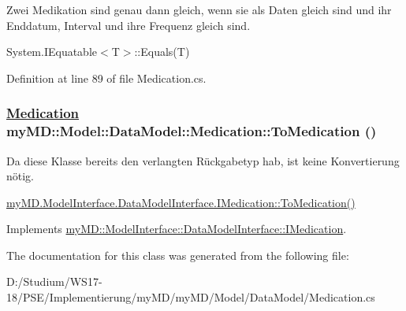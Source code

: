 Zwei Medikation sind genau dann gleich, wenn sie als Daten gleich sind und ihr Enddatum, Interval und ihre Frequenz gleich sind. 

System.IEquatable$<$T$>$::Equals(T) 

Definition at line 89 of file Medication.cs.\hypertarget{classmy_m_d_1_1_model_1_1_data_model_1_1_medication_be8159bf4c393a1da18275bd4dfa8e4a}{
\subsubsection[ToMedication]{\setlength{\rightskip}{0pt plus 5cm}\hyperlink{classmy_m_d_1_1_model_1_1_data_model_1_1_medication}{Medication} my\-MD::Model::Data\-Model::Medication::To\-Medication ()}}
\label{d0/daf/classmy_m_d_1_1_model_1_1_data_model_1_1_medication_be8159bf4c393a1da18275bd4dfa8e4a}


Da diese Klasse bereits den verlangten R\"{u}ckgabetyp hab, ist keine Konvertierung n\"{o}tig. 

\hyperlink{interfacemy_m_d_1_1_model_interface_1_1_data_model_interface_1_1_i_medication_be8159bf4c393a1da18275bd4dfa8e4a}{my\-MD.Model\-Interface.Data\-Model\-Interface.IMedication::To\-Medication()} 

Implements \hyperlink{interfacemy_m_d_1_1_model_interface_1_1_data_model_interface_1_1_i_medication_be8159bf4c393a1da18275bd4dfa8e4a}{my\-MD::Model\-Interface::Data\-Model\-Interface::IMedication}.

The documentation for this class was generated from the following file:\begin{CompactItemize}
\item 
D:/Studium/WS17-18/PSE/Implementierung/my\-MD/my\-MD/Model/Data\-Model/Medication.cs\end{CompactItemize}

